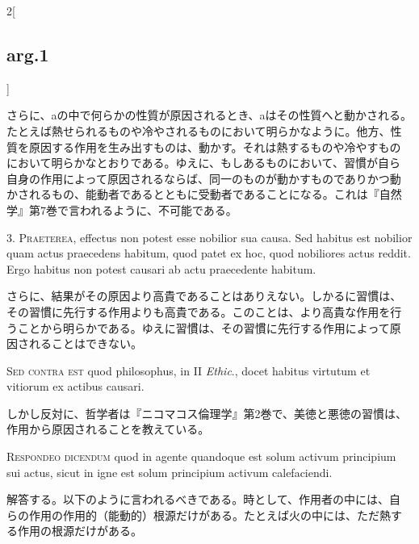 \documentclass[paper=a4paper,fontsize=10pt,jafontsize=9pt,titlepage]{jlreq}
\begin{document}
\begin{paracol}{2}[\subsection{arg.1}]
\switchcolumn

さらに、aの中で何らかの性質が原因されるとき、aはその性質へと動かされる。
たとえば熱せられるものや冷やされるものにおいて明らかなように。他方、性
質を原因する作用を生み出すものは、動かす。それは熱するものや冷やすもの
において明らかなとおりである。ゆえに、もしあるものにおいて、習慣が自ら
自身の作用によって原因されるならば、同一のものが動かすものでありかつ動
かされるもの、能動者であるとともに受動者であることになる。これは『自然
学』第7巻で言われるように、不可能である。


3. {\scshape Praeterea}, effectus non potest esse nobilior sua
causa. Sed habitus est nobilior quam actus praecedens habitum, quod
patet ex hoc, quod nobiliores actus reddit. Ergo habitus non potest
causari ab actu praecedente habitum.

\switchcolumn

さらに、結果がその原因より高貴であることはありえない。しかるに習慣は、
その習慣に先行する作用よりも高貴である。このことは、より高貴な作用を行
うことから明らかである。ゆえに習慣は、その習慣に先行する作用によって原
因されることはできない。

\switchcolumn*[\subsection{s.c.}]

{\scshape Sed contra est} quod philosophus, in II {\itshape Ethic}.,
docet habitus virtutum et vitiorum ex actibus causari.

\switchcolumn

しかし反対に、哲学者は『ニコマコス倫理学』第2巻で、美徳と悪徳の習慣は、
作用から原因されることを教えている。


{\scshape Respondeo dicendum} quod in agente quandoque est solum
activum principium sui actus, sicut in igne est solum principium
activum calefaciendi.

\switchcolumn

解答する。以下のように言われるべきである。時として、作用者の中には、自
らの作用の作用的（能動的）根源だけがある。たとえば火の中には、ただ熱す
る作用の根源だけがある。


\end{paracol}
\end{document}
